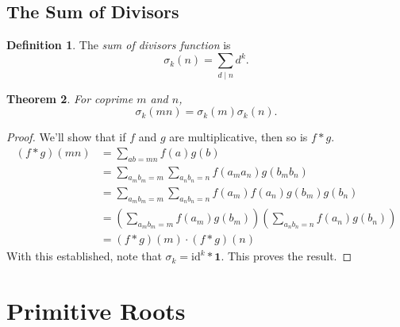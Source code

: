 \documentclass{amsbook}
\numberwithin{section}{chapter}
\theoremstyle{plain}
\newtheorem{thm}{Theorem}[section]
\theoremstyle{definition}
\newtheorem{defn}[thm]{Definition}
\def\id{\text{id}}
\begin{document}
\section{The Sum of Divisors}
\begin{defn}
The \textit{sum of divisors function} is
\[\sigma_k(n) = \sum_{d\mid n}d^k.\]
\end{defn}
\begin{thm}
For coprime $m$ and $n$,
\[\sigma_k(mn) = \sigma_k(m)\sigma_k(n).\]
\end{thm}
\begin{proof}
We'll show that if $f$ and $g$ are multiplicative, then
so is $f * g$. 
\begin{align*}
(f*g)(mn)
&= \sum_{ab = mn}f(a)g(b)\\
&= \sum_{a_mb_m = m}\sum_{a_nb_n = n}f(a_ma_n)g(b_mb_n)\\
&= \sum_{a_mb_m = m}\sum_{a_nb_n = n}f(a_m)f(a_n)g(b_m)g(b_n)\\[0.5em]
&=\left(\sum_{a_mb_m = m}f(a_m)g(b_m)\right)\left(\sum_{a_nb_n = n}
f(a_n)g(b_n)\right)\\[0.5em]
&=
(f*g)(m)\cdot(f*g)(n)
\end{align*}
With this established, note that $\sigma_k = \id^k *\boldsymbol 1$.
This proves the result.
\end{proof}
\chapter{Primitive Roots}
\end{document}
